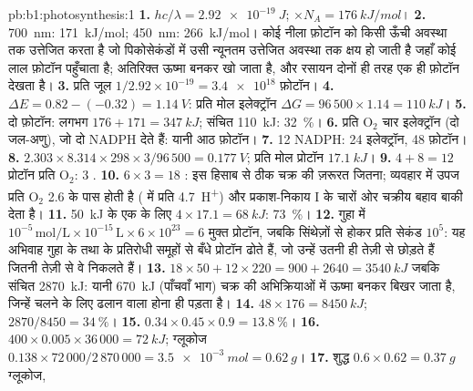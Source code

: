 \begin{solution}{pb:b1:photosynthesis:1}
\textbf{1.} $hc/\lambda = \qty{2.92e-19}{J}$; $\times N_A = \qty{176}{kJ/mol}$।
\textbf{2.} \qty{700}{nm}: \qty{171}{kJ/mol}; \qty{450}{nm}:
\qty{266}{kJ/mol}। कोई नीला फ़ोटॉन  को किसी ऊँची अवस्था तक
उत्तेजित करता है जो पिकोसेकंडों में उसी न्यूनतम उत्तेजित अवस्था तक क्षय
हो जाती है जहाँ कोई लाल फ़ोटॉन पहुँचाता है; अतिरिक्त ऊष्मा बनकर खो जाता है,
और रसायन दोनों ही तरह एक ही फ़ोटॉन देखता है।
\textbf{3.} प्रति जूल $1/2.92\times 10^{-19} = \num{3.4e18}$ फ़ोटॉन।
\textbf{4.} $\Delta E = 0.82 - (-0.32) = \qty{1.14}{V}$: प्रति मोल
इलेक्ट्रॉन $\Delta G =
96\,500\times 1.14 = \qty{110}{kJ}$।
\textbf{5.} दो फ़ोटॉन: लगभग $176 + 171 = \qty{347}{kJ}$; संचित
\qty{110}{kJ}: \qty{32}{\%}।
\textbf{6.} प्रति $\mathrm{O_2}$ चार इलेक्ट्रॉन (दो जल-अणु),
जो दो NADPH देते हैं: यानी आठ फ़ोटॉन।
\textbf{7.} 12 NADPH: 24 इलेक्ट्रॉन, 48 फ़ोटॉन।
\textbf{8.} $2.303\times 8.314\times 298\times 3/96\,500 = \qty{0.177}{V}$;
प्रति मोल प्रोटॉन $\qty{17.1}{kJ}$।
\textbf{9.} $4 + 8 = 12$ प्रोटॉन प्रति $\mathrm{O_2}$: 3 .
\textbf{10.} $6\times 3 = 18$ : इस हिसाब से ठीक चक्र की ज़रूरत जितना;
व्यवहार में उपज प्रति $\mathrm{O_2}$ 2.6 के पास होती है
( में प्रति  \qty{4.7}{H^+}) और प्रकाश-निकाय I के चारों ओर
चक्रीय बहाव बाकी देता है।
\textbf{11.} \qty{50}{kJ} के एक  के लिए $4\times 17.1 = \qty{68}{kJ}$:
\qty{73}{\%}।
\textbf{12.} गुहा में $10^{-5}\,\mathrm{mol/L}\times 10^{-15}\,\mathrm{L}\times
6\times 10^{23} = 6$ मुक्त प्रोटॉन, जबकि सिंथेज़ों से होकर प्रति सेकंड
$10^5$: यह अभिवाह गुहा के  तथा  के प्रतिरोधी समूहों से
बँधे प्रोटॉन ढोते हैं, जो उन्हें उतनी ही तेज़ी से छोड़ते हैं जितनी तेज़ी
से वे निकलते हैं।
\textbf{13.} $18\times 50 + 12\times 220 = 900 + 2640 = \qty{3540}{kJ}$
जबकि संचित \qty{2870}{kJ}:
यानी \qty{670}{kJ} (पाँचवाँ भाग) चक्र की अभिक्रियाओं में ऊष्मा बनकर
बिखर जाता है, जिन्हें चलने के लिए ढलान वाला होना ही पड़ता है।
\textbf{14.} $48\times 176 = \qty{8450}{kJ}$; $2870/8450 = \qty{34}{\%}$।
\textbf{15.} $0.34\times 0.45\times 0.9 = \qty{13.8}{\%}$।
\textbf{16.} $400\times 0.005\times 36\,000 = \qty{72}{kJ}$; ग्लूकोज
$0.138\times 72\,000/2\,870\,000 = \qty{3.5e-3}{mol} = \qty{0.62}{g}$।
\textbf{17.} शुद्ध $0.6\times 0.62 = \qty{0.37}{g}$ ग्लूकोज,

\end{solution}
